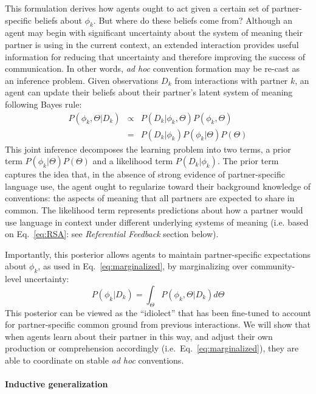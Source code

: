 This formulation derives how agents ought to act given a certain set of partner-specific beliefs about $\phi_k$.
But where do these beliefs come from?
Although an agent may begin with significant uncertainty about the system of meaning their partner is using in the current context, an extended interaction provides useful information for reducing that uncertainty and therefore improving the success of communication.
In other words, \emph{ad hoc} convention formation may be re-cast as an inference problem.
Given observations $D_k$ from interactions with partner $k$, an agent can update their beliefs about their partner's latent system of meaning following Bayes rule:
\begin{equation}
\begin{array}{rcl}
\label{eq:joint_inference}
P(\phi_k, \Theta | D_k)  & \propto &  P(D_k | \phi_k, \Theta) P(\phi_k, \Theta) \\
                           & =   & P(D_k | \phi_k) P(\phi_k | \Theta) P(\Theta)
\end{array}
\end{equation}
This joint inference decomposes the learning problem into two terms, a prior term $P(\phi_k | \Theta)P(\Theta)$ and a likelihood term $P(D_k | \phi_k)$.
The prior term captures the idea that, in the absence of strong evidence of partner-specific language use, the agent ought to regularize toward their background knowledge of conventions: the aspects of meaning that all partners are expected to share in common.
The likelihood term represents predictions about how a partner would use language in context under different underlying systems of meaning (i.e. based on Eq.~\ref{eq:RSA}: see \emph{Referential Feedback} section below).

Importantly, this posterior allows agents to maintain partner-specific expectations about $\phi_k$, as used in Eq.~\ref{eq:marginalized}, by marginalizing over community-level uncertainty:
\begin{equation}
P(\phi_k | D_k) =  \int_{\Theta}P(\phi_k, \Theta | D_k)  d\Theta
\end{equation}
This posterior can be viewed as the ``idiolect'' that has been fine-tuned to account for partner-specific common ground from previous interactions.
We will show that when agents learn about their partner in this way, and adjust their own production or comprehension accordingly (i.e.~Eq.~\ref{eq:marginalized}), they are able to coordinate on stable \emph{ad hoc} conventions.

\paragraph{Inductive generalization}

